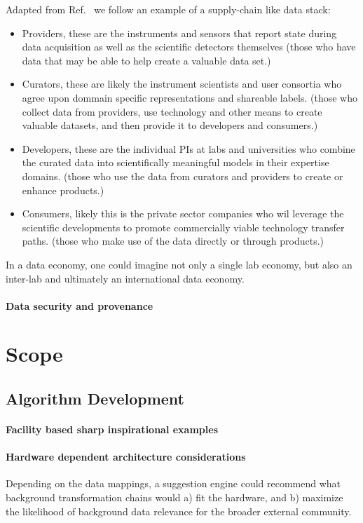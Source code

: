 \documentclass{article}
\begin{document}
Adapted from Ref.~\cite{Elbaz2012} we follow an example of a supply-chain like data stack: %
\begin{itemize}
\item Providers, these are the instruments and sensors that report state during data acquisition as well as the scientific detectors themselves (those who have data that may be able to help create a valuable data set.)
\item Curators, these are likely the instrument scientists and user consortia who agree upon dommain specific representations and shareable labels. (those who collect data from providers, use technology and other means to create valuable datasets, and then provide it to developers and consumers.)
\item Developers, these are the individual PIs at labs and universities who combine the curated data into scientifically meaningful models in their expertise domains. (those who use the data from curators and providers to create or enhance products.)
\item Consumers, likely this is the private sector companies who wil leverage the scientific developments to promote commercially viable technology transfer paths. (those who make use of the data directly or through products.)
\end{itemize}


In a data economy, one could imagine not only a single lab economy, but also an inter-lab and ultimately an international data economy.


\paragraph{Data security and provenance}


\section{Scope}

\subsection{Algorithm Development}
\paragraph{Facility based sharp inspirational examples}
\paragraph{Hardware dependent architecture considerations}
Depending on the data mappings, a suggestion engine could recommend what background transformation chains would a) fit the hardware, and b) maximize the likelihood of background data relevance for the broader external community.
\end{document}
